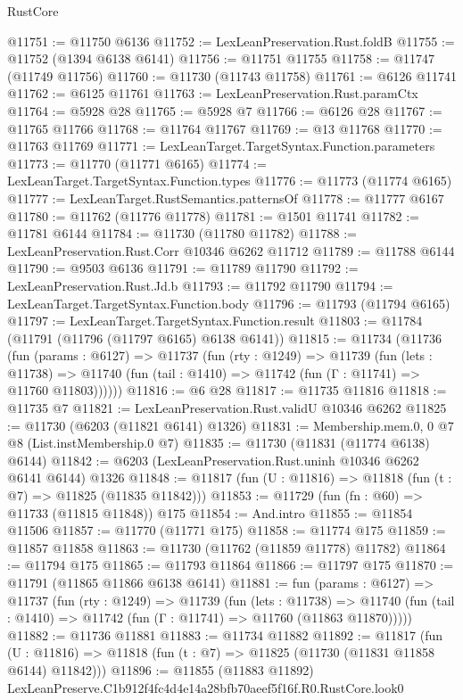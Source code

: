 \begin{lexlean}{RustCore}
\begin{coremodule}
@11751 := @11750 @6136
@11752 := LexLeanPreservation.Rust.foldB
@11755 := @11752 (@1394 @6138 @6141)
@11756 := @11751 @11755
@11758 := @11747 (@11749 @11756)
@11760 := @11730 (@11743 @11758)
@11761 := @6126 @11741
@11762 := @6125 @11761
@11763 := LexLeanPreservation.Rust.paramCtx
@11764 := @5928 @28
@11765 := @5928 @7
@11766 := @6126 @28
@11767 := @11765 @11766
@11768 := @11764 @11767
@11769 := @13 @11768
@11770 := @11763 @11769
@11771 := LexLeanTarget.TargetSyntax.Function.parameters
@11773 := @11770 (@11771 @6165)
@11774 := LexLeanTarget.TargetSyntax.Function.types
@11776 := @11773 (@11774 @6165)
@11777 := LexLeanTarget.RustSemantics.patternsOf
@11778 := @11777 @6167
@11780 := @11762 (@11776 @11778)
@11781 := @1501 @11741
@11782 := @11781 @6144
@11784 := @11730 (@11780 @11782)
@11788 := LexLeanPreservation.Rust.Corr @10346 @6262 @11712
@11789 := @11788 @6144
@11790 := @9503 @6136
@11791 := @11789 @11790
@11792 := LexLeanPreservation.Rust.Jd.b
@11793 := @11792 @11790
@11794 := LexLeanTarget.TargetSyntax.Function.body
@11796 := @11793 (@11794 @6165)
@11797 := LexLeanTarget.TargetSyntax.Function.result
@11803 := @11784 (@11791 (@11796 (@11797 @6165) @6138 @6141))
@11815 := @11734
    (@11736
      (fun (params : @6127) =>
      @11737
        (fun (rty : @1249) =>
        @11739
          (fun (lets : @11738) =>
          @11740 (fun (tail : @1410) => @11742 (fun (Γ : @11741) => @11760 @11803))))))
@11816 := @6 @28
@11817 := @11735 @11816
@11818 := @11735 @7
@11821 := LexLeanPreservation.Rust.validU @10346 @6262
@11825 := @11730 (@6203 (@11821 @6141) @1326)
@11831 := Membership.mem.{0, 0} @7 @8 (List.instMembership.{0} @7)
@11835 := @11730 (@11831 (@11774 @6138) @6144)
@11842 := @6203 (LexLeanPreservation.Rust.uninh @10346 @6262 @6141 @6144) @1326
@11848 := @11817 (fun (U : @11816) => @11818 (fun (t : @7) => @11825 (@11835 @11842)))
@11853 := @11729 (fun (fn : @60) => @11733 (@11815 @11848)) @175
@11854 := And.intro
@11855 := @11854 @11506
@11857 := @11770 (@11771 @175)
@11858 := @11774 @175
@11859 := @11857 @11858
@11863 := @11730 (@11762 (@11859 @11778) @11782)
@11864 := @11794 @175
@11865 := @11793 @11864
@11866 := @11797 @175
@11870 := @11791 (@11865 @11866 @6138 @6141)
@11881 := fun (params : @6127) =>
  @11737
    (fun (rty : @1249) =>
    @11739
      (fun (lets : @11738) =>
      @11740 (fun (tail : @1410) => @11742 (fun (Γ : @11741) => @11760 (@11863 @11870)))))
@11882 := @11736 @11881
@11883 := @11734 @11882
@11892 := @11817
    (fun (U : @11816) => @11818 (fun (t : @7) => @11825 (@11730 (@11831 @11858 @6144) @11842)))
@11896 := @11855 (@11883 @11892) LexLeanPreserve.C1b912f4fc4d4e14a28bfb70aeef5f16f.R0.RustCore.look0

\end{coremodule}
\end{lexlean}
